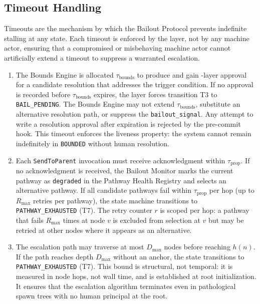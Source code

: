 \subsection{Timeout Handling}
\label{sec:bp-timeouts}

Timeouts are the mechanism by which the Bailout Protocol prevents indefinite stalling at any state. Each timeout is enforced by the \fact{} layer, not by any machine actor, ensuring that a compromised or misbehaving machine actor cannot artificially extend a timeout to suppress a warranted escalation.

\begin{enumerate}
\item[\textbf{$\tau_{\text{bounds}}$ --- BOUNDED state timeout.}] The Bounds Engine is allocated $\tau_{\text{bounds}}$ to produce and gain \fact{}-layer approval for a candidate resolution that addresses the trigger condition. If no approval is recorded before $\tau_{\text{bounds}}$ expires, the \fact{} layer forces transition T3 to \texttt{BAIL\_PENDING}. The Bounds Engine may not extend $\tau_{\text{bounds}}$, substitute an alternative resolution path, or suppress the \texttt{bailout\_signal}. Any attempt to write a resolution approval after expiration is rejected by the pre-commit hook. This timeout enforces the liveness property: the system cannot remain indefinitely in \texttt{BOUNDED} without human resolution.

\item[\textbf{$\tau_{\text{prop}}$ --- Propagation timeout.}] Each \texttt{SendToParent} invocation must receive acknowledgment within $\tau_{\text{prop}}$. If no acknowledgment is received, the Bailout Monitor marks the current pathway as \texttt{degraded} in the Pathway Health Registry and selects an alternative pathway. If all candidate pathways fail within $\tau_{\text{prop}}$ per hop (up to $R_{\max}$ retries per pathway), the state machine transitions to \texttt{PATHWAY\_EXHAUSTED} (T7). The retry counter $r$ is scoped per hop: a pathway that fails $R_{\max}$ times at node $v$ is excluded from selection at $v$ but may be retried at other nodes where it appears as an alternative.

\item[\textbf{$\tau_{\text{cap}}$ --- Cascade depth limit.}] The escalation path may traverse at most $D_{\max}$ nodes before reaching $h(n)$. If the path reaches depth $D_{\max}$ without an anchor, the state transitions to \texttt{PATHWAY\_EXHAUSTED} (T7). This bound is structural, not temporal: it is measured in node hops, not wall time, and is established at root initialization. It ensures that the escalation algorithm terminates even in pathological spawn trees with no human principal at the root.


\end{enumerate}
